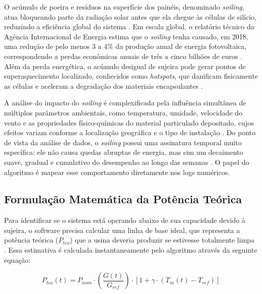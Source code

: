 \documentclass{UNESC}
\begin{document}
O acúmulo de poeira e resíduos na superfície dos painéis, denominado
\textit{soiling}, atua bloqueando parte da radiação solar antes que ela
chegue às células de silício, reduzindo a eficiência global do sistema
\cite{abuzaid2022}. Em escala global, o relatório técnico da Agência
Internacional de Energia estima que o \textit{soiling} tenha causado, em
2018, uma redução de pelo menos 3 a 4\% da produção anual de energia
fotovoltaica, correspondendo a perdas econômicas anuais de três a cinco
bilhões de euros \cite{iea_pvps2022}. Além da perda energética, o acúmulo
desigual de sujeira pode gerar pontos de superaquecimento localizado,
conhecidos como \textit{hotspots}, que danificam fisicamente as células e
aceleram a degradação dos materiais encapsulantes \cite{jaszczur2020}.

A análise do impacto do \textit{soiling} é complexificada pela influência
simultânea de múltiplos parâmetros ambientais, como temperatura, umidade,
velocidade do vento e as propriedades físico-químicas do material
particulado depositado, cujos efeitos variam conforme a localização
geográfica e o tipo de instalação \cite{borah2023}. Do ponto de vista
da análise de dados, o \textit{soiling} possui uma assinatura temporal
muito específica: ele não causa quedas abruptas de energia, mas sim um
decaimento suave, gradual e cumulativo do desempenho ao longo das semanas
\cite{Tramontin_Rampinelli_2024}. O papel do algoritmo é mapear esse
comportamento diretamente nos logs numéricos.

\subsection{Formulação Matemática da Potência Teórica}

Para identificar se o sistema está operando abaixo de sua capacidade
devido à sujeira, o software precisa calcular uma linha de base ideal,
que representa a potência teórica ($P_{teo}$) que a usina deveria produzir
se estivesse totalmente limpa \cite{fernandez2022estimation}. Essa estimativa
é calculada instantaneamente pelo algoritmo através da seguinte equação:

\begin{equation}
    P_{teo}(t) = P_{nom} \cdot \left( \frac{G(t)}{G_{ref}} \right) \cdot
    \left[ 1 + \gamma \cdot \left( T_m(t) - T_{ref} \right) \right]
\end{equation}
\end{document}
